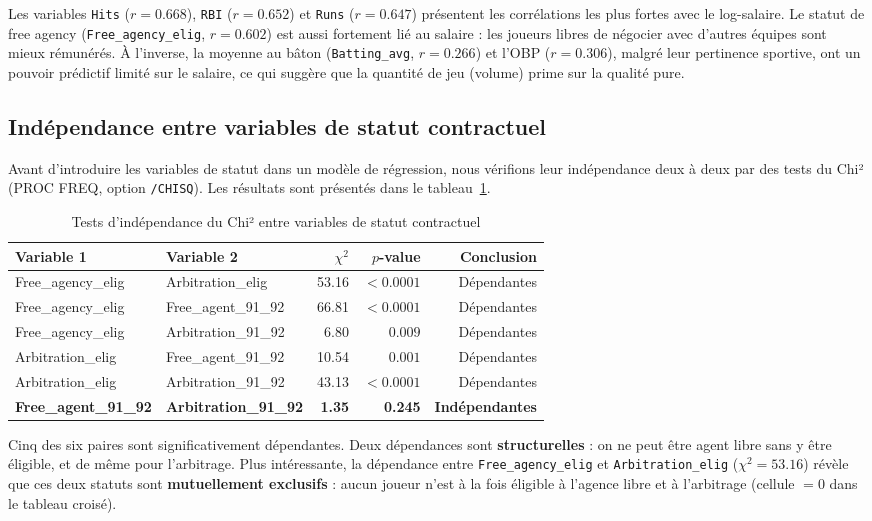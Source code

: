 \documentclass[11pt,a4paper]{article}
\begin{document}
Les variables \texttt{Hits} ($r = 0.668$), \texttt{RBI} ($r = 0.652$) et \texttt{Runs}
($r = 0.647$) présentent les corrélations les plus fortes avec le log-salaire. Le statut
de free agency (\texttt{Free\_agency\_elig}, $r = 0.602$) est aussi fortement lié au
salaire : les joueurs libres de négocier avec d'autres équipes sont mieux rémunérés.
À l'inverse, la moyenne au bâton (\texttt{Batting\_avg}, $r = 0.266$) et l'OBP
($r = 0.306$), malgré leur pertinence sportive, ont un pouvoir prédictif limité sur le
salaire, ce qui suggère que la quantité de jeu (volume) prime sur la qualité pure.

\subsection{Indépendance entre variables de statut contractuel}

Avant d'introduire les variables de statut dans un modèle de régression, nous
vérifions leur indépendance deux à deux par des tests du Chi² (PROC FREQ,
option \texttt{/CHISQ}). Les résultats sont présentés dans le tableau~\ref{tab:chi2}.

\begin{table}[H]
\centering
\caption{Tests d'indépendance du Chi² entre variables de statut contractuel}
\label{tab:chi2}
\small
\begin{tabular}{llrrr}
\toprule
\textbf{Variable 1} & \textbf{Variable 2} & \textbf{$\chi^2$} & \textbf{$p$-value} & \textbf{Conclusion} \\
\midrule
Free\_agency\_elig   & Arbitration\_elig    & 53.16 & $<0.0001$ & Dépendantes \\
Free\_agency\_elig   & Free\_agent\_91\_92  & 66.81 & $<0.0001$ & Dépendantes \\
Free\_agency\_elig   & Arbitration\_91\_92  & 6.80  & $0.009$   & Dépendantes \\
Arbitration\_elig    & Free\_agent\_91\_92  & 10.54 & $0.001$   & Dépendantes \\
Arbitration\_elig    & Arbitration\_91\_92  & 43.13 & $<0.0001$ & Dépendantes \\
\textbf{Free\_agent\_91\_92} & \textbf{Arbitration\_91\_92}
  & \textbf{1.35} & \textbf{0.245} & \textbf{Indépendantes} \\
\bottomrule
\end{tabular}
\end{table}

Cinq des six paires sont significativement dépendantes. Deux dépendances sont
\textbf{structurelles} : on ne peut être agent libre sans y être éligible, et
de même pour l'arbitrage. Plus intéressante, la dépendance entre
\texttt{Free\_agency\_elig} et \texttt{Arbitration\_elig} ($\chi^2 = 53.16$)
révèle que ces deux statuts sont \textbf{mutuellement exclusifs} : aucun joueur
n'est à la fois éligible à l'agence libre et à l'arbitrage (cellule $= 0$ dans le
tableau croisé).\vspace{0.3cm}
\end{document}
